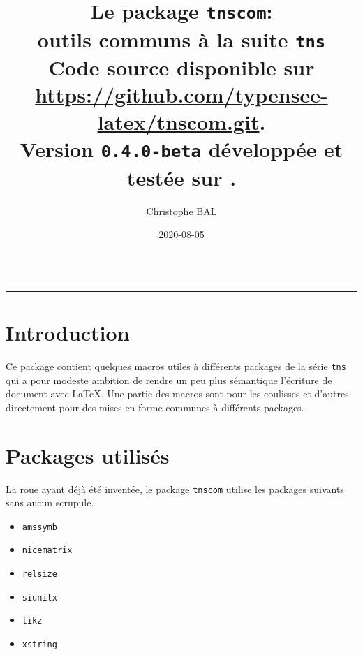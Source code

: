 \documentclass[12pt,a4paper]{article}
\theoremstyle{definition}
\begin{document}
\renewcommand\labelitemi{\raisebox{0.125em}{\tiny\textbullet}}
\renewcommand{\labelitemii}{---}

\title{  %
	Le package \texttt{tnscom}:\\%
	outils communs à la suite \texttt{tns}\\%
	{\footnotesize Code source disponible sur \url{https://github.com/typensee-latex/tnscom.git}.}\\%
{\footnotesize Version \texttt{0.4.0-beta} développée et testée sur \macosxname{}.}%
}
\author{Christophe BAL}
\date{2020-08-05}{{{{{{{{{{{

\maketitle


\vspace{2em}

\hrule

\tableofcontents

\vspace{1.5em}

\hrule

\newpage

\section{Introduction}

Ce package contient quelques macros utiles à différents packages de la série \verb#tns# qui a pour modeste ambition de rendre un peu plus sémantique l'écriture de document avec \LaTeX.
Une partie des macros sont pour les coulisses et d'autres directement pour des mises en forme communes à différents packages.


\section{Packages utilisés}

La roue ayant déjà été inventée, le package \verb#tnscom# utilise les packages suivants sans aucun scrupule.

\begin{multicols}{4}
    \begin{itemize}
\item \verb#amssymb#
    \item \verb#nicematrix#
    \item \verb#relsize#
    \item \verb#siunitx#
    \item \verb#tikz#
    \item \verb#xstring#
    \end{itemize}
\end{multicols}
}}}}}}}}}}}
\end{document}
